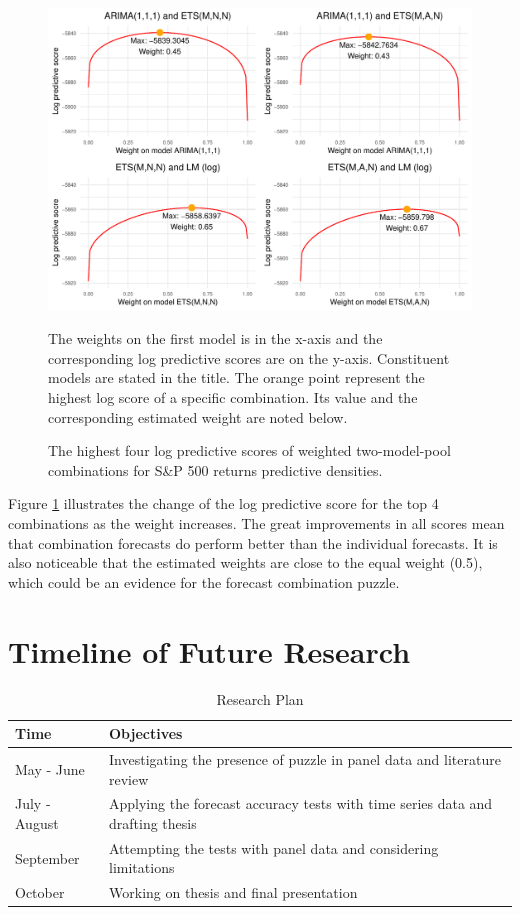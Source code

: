\documentclass{monashthesis}
\begin{document}
\begin{figure}[ht]
\centering
\caption{The highest four log predictive scores of weighted two-model-pool combinations for S\&P 500 returns predictive densities. }
\includegraphics{figures/best4comb.pdf}
\begin{flushleft}
{\footnotesize The weights on the first model is in the x-axis and the corresponding log predictive scores are on the y-axis. Constituent models are stated in the title. The orange point represent the highest log score of a specific combination. Its value and the corresponding estimated weight are noted below.}\\
\end{flushleft}
\label{fig:best4}
\end{figure}

Figure \ref{fig:best4} illustrates the change of the log predictive score for the top 4 combinations as the weight increases. The great improvements in all scores mean that combination forecasts do perform better than the individual forecasts. It is also noticeable that the estimated weights are close to the equal weight (0.5), which could be an evidence for the forecast combination puzzle.

\hypertarget{timeline-of-future-research}{%
\section{Timeline of Future Research}\label{timeline-of-future-research}}

\begin{table}[htbp]
  \centering
  \caption{Research Plan}
    \begin{tabular}{ll}
    Time  & Objectives \\
    \midrule
    May - June & Investigating the presence of puzzle in panel data and literature review \\
    July - August & Applying the forecast accuracy tests with time series data and drafting thesis  \\
    September & Attempting the tests with panel data and considering limitations \\
    October & Working on thesis and final presentation \\
    \end{tabular}
\end{table}
\end{document}
